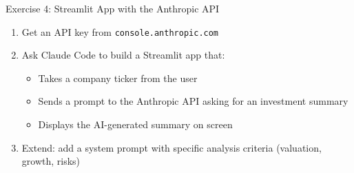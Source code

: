 \documentclass[aspectratio=169]{beamer}
\begin{document}
\begin{frame}{Exercise 4: Streamlit App with the Anthropic API}
\begin{enumerate}
  \item Get an API key from \texttt{console.anthropic.com}
  \item Ask Claude Code to build a Streamlit app that:
  \begin{itemize}\small
    \item Takes a company ticker from the user
    \item Sends a prompt to the Anthropic API asking for an investment summary
    \item Displays the AI-generated summary on screen
  \end{itemize}
  \item Extend: add a system prompt with specific analysis criteria (valuation, growth, risks)
\end{enumerate}
\end{frame}
\end{document}
